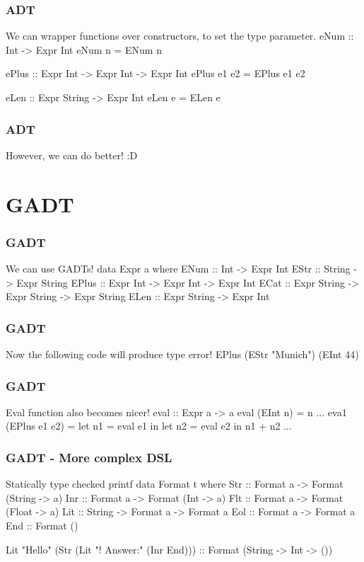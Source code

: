 \documentclass{beamer}
\newenvironment{VerbExample}
{\example\semiverbatim}
{\endsemiverbatim\endexample}
\begin{document}
\begin{frame}[fragile]
  \frametitle{ADT}
We can wrapper functions over constructors, to set the type parameter.
  \begin{VerbExample}
eNum :: Int -> Expr Int
eNum n = ENum n

ePlus :: Expr Int -> Expr Int -> Expr Int
ePlus e1 e2 = EPlus e1 e2

eLen :: Expr String -> Expr Int
eLen e = ELen e
\end{VerbExample}

\end{frame}

\begin{frame}[fragile]
  \frametitle{ADT}
However, we can do better! :D
\end{frame}

\section{GADT}

\begin{frame}[fragile]
  \frametitle{GADT}
We can use GADTs!
  \begin{VerbExample}
data Expr a where
  ENum :: Int -> Expr Int
  EStr :: String -> Expr String
  EPlus :: Expr Int -> Expr Int -> Expr Int
  ECat :: Expr String -> Expr String -> Expr String
  ELen :: Expr String -> Expr Int
\end{VerbExample}
\end{frame}

\begin{frame}[fragile]
  \frametitle{GADT}
Now the following code will produce type error!
  \begin{VerbExample}
EPlus (EStr "Munich") (EInt 44)
\end{VerbExample}
\end{frame}

\begin{frame}[fragile]
  \frametitle{GADT}
Eval function also becomes nicer!
  \begin{VerbExample}
eval :: Expr a -> a
eval (EInt n) = n
...
eva1 (EPlus e1 e2) =
  let n1 = eval e1 in
  let n2 = eval e2 in
  n1 + n2
...
\end{VerbExample}
\end{frame}


\begin{frame}[fragile]
  \frametitle{GADT - More complex DSL}
Statically type checked printf
  \begin{VerbExample}
data Format t where
  Str :: Format a -> Format (String -> a)
  Inr :: Format a -> Format (Int -> a)
  Flt :: Format a -> Format (Float -> a)
  Lit :: String -> Format a -> Format a
  Eol :: Format a -> Format a
  End :: Format ()

Lit "Hello" (Str (Lit "! Answer:" (Inr End)))
:: Format (String -> Int -> ())
\end{VerbExample}
\end{frame}
\end{document}

